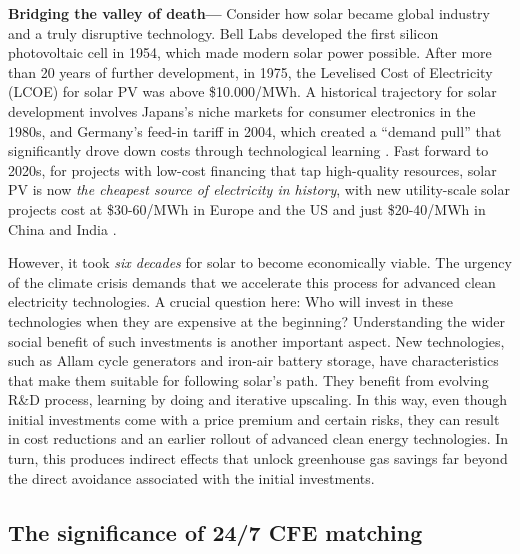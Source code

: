 \documentclass[pdflatex,sn-basic, Numbered]{sn-jnl}%
\theoremstyle{thmstyleone}%
\theoremstyle{thmstyletwo}%
\theoremstyle{thmstylethree}%
\begin{document}
\textbf{Bridging the valley of death---} Consider how solar became global industry and a truly disruptive technology. Bell Labs developed the first silicon photovoltaic cell in 1954, which made modern solar power possible. After more than 20 years of further development, in 1975, the Levelised Cost of Electricity (LCOE) for solar PV was above \$10.000/MWh. A historical trajectory for solar development involves Japans's niche markets for consumer electronics in the 1980s, and Germany's feed-in tariff in 2004, which created a \enquote{demand pull} that significantly drove down costs through technological learning \cite{nemetHowSolarEnergy2019}. Fast forward to 2020s, for projects with low-cost financing that tap high-quality resources, solar PV is now \textit{the cheapest source of electricity in history}, with new utility-scale solar projects cost at \$30-60/MWh in Europe and the US and just \$20-40/MWh in China and India \cite{WorldEnergyOutlook2020}.

However, it took \textit{six decades} for solar to become economically viable. The urgency of the climate crisis demands that we accelerate this process for advanced clean electricity technologies. A crucial question here: Who will invest in these technologies when they are expensive at the beginning? Understanding the wider social benefit of such investments is another important aspect.  New technologies, such as Allam cycle generators and iron-air battery storage, have characteristics that make them suitable for following solar's path. They benefit from evolving R\&D process, learning by doing and iterative upscaling. In this way, even though initial investments come with a price premium and certain risks, they can result in cost reductions and an earlier rollout of advanced clean energy technologies. In turn, this produces indirect effects that unlock greenhouse gas savings far beyond the direct avoidance associated with the initial investments.

\subsection*{The significance of 24/7 CFE matching}\label{sec2}
\end{document}
